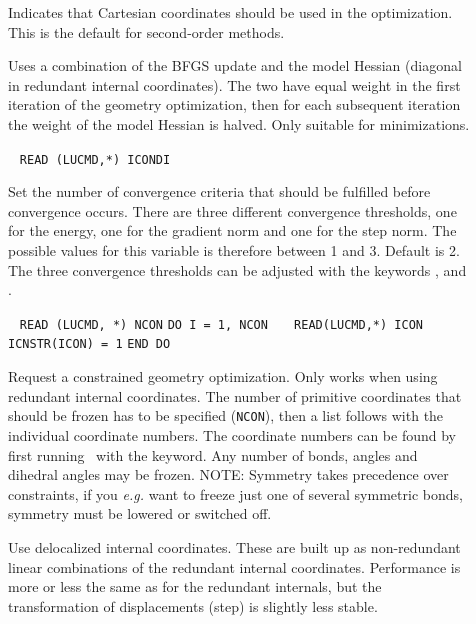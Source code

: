 \begin{description}
\item[]
Indicates that Cartesian coordinates
should be used in the optimization. This is the default for
second-order methods.

\item[]
Uses a combination of the BFGS update and the model Hessian (diagonal
in redundant internal coordinates). The two have equal weight in the
first iteration of the geometry optimization, then for each subsequent
iteration the weight of the model Hessian is halved. Only suitable for
minimizations.

\item[]\verb| |
\newline
\verb|READ (LUCMD,*) ICONDI|

Set the number of convergence criteria
that should be fulfilled before
convergence occurs. There are three different convergence thresholds,
one for the energy, one for the gradient
norm and one for the step
norm. The possible values for this variable is
therefore between 1 and
3. Default is 2. The three convergence thresholds can be adjusted with
the keywords ,  and .

\item[]\verb| |\newline
\verb|READ (LUCMD, *) NCON|\newline
\verb|DO I = 1, NCON|\newline
\verb|   READ(LUCMD,*) ICON|\newline
\verb|   ICNSTR(ICON) = 1|\newline
\verb|END DO|

Request a constrained geometry optimization. Only works when using
redundant internal coordinates. The number of primitive coordinates
that should be frozen has to be specified (\verb|NCON|), then a list
follows with the individual coordinate numbers. The coordinate numbers
can be found by first running \dalton\ with the 
keyword. Any number of bonds, angles and dihedral angles may be
frozen. NOTE: Symmetry takes precedence over constraints, if you
{\it e.g.\/} want to freeze just one of several symmetric bonds, symmetry
must be lowered or switched off.

\item[]
Use delocalized internal coordinates.
These are built up as
non-redundant linear combinations of the redundant internal
coordinates. Performance is more or less the same as for the redundant
internals, but the transformation of displacements (step) is slightly
less stable.


\end{description}
